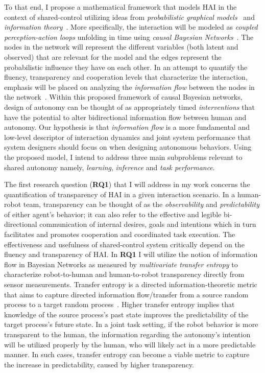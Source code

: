 \documentclass[12pt]{article}
\newcommand{\DGc}[1]{{\textbf{\color{blue}{#1}}}}
\begin{document}
To that end, I propose a mathematical framework that models HAI in the context of shared-control utilizing ideas from \textit{probabilistic graphical models}~\cite{koller2009probabilistic} and \textit{information theory}~\cite{cover2012elements}. More specifically, the interaction will be modeled as \textit{coupled perception-action loops} unfolding in time using \textit{causal Bayesian Networks}~\cite{pearl2009causality}. The nodes in the network will represent the different variables (both latent and observed) that are relevant for the model and the edges represent the probabilistic influence they have on each other. In an attempt to quantify the fluency, transparency and cooperation levels that characterize the interaction, emphasis will be placed on analyzing the \textit{information flow} between the nodes in the network~\cite{ay2008information}. Within this proposed framework of causal Bayesian networks, design of autonomy can be thought of as appropriately timed \textit{interventions} that have the potential to alter bidirectional information flow between human and autonomy.
Our hypothesis is that \textit{information flow} is a more fundamental and low-level descriptor of interaction dynamics and joint system performance that system designers should focus on when designing autonomous behaviors.
Using the proposed model, I intend to address three main subproblems relevant to shared autonomy namely, \textit{learning}, \textit{inference} and \textit{task performance}.

The first research question (\textbf{RQ1}) that I will address in my work concerns the quantification of transparency of HAI in a given interaction scenario. In a human-robot team, transparency can be thought of as the \textit{observability} and \textit{predictability} of either agent's behavior; it can also refer to the effective and legible bi-directional communication of internal desires, goals and intentions which in turn facilitates and promotes cooperation and coordinated task execution. The effectiveness and usefulness of shared-control system critically depend on the fluency and transparency of HAI. In \textbf{RQ1} I will utilize the notion of information flow in Bayesian Networks as measured by \textit{multivariate transfer entropy} to characterize robot-to-human and human-to-robot transparency directly from sensor measurements.  Transfer entropy is a directed information-theoretic metric that aims to capture directed information flow/transfer from a source random process to a target random process~\cite{schreiber2000measuring}. Higher transfer entropy implies that knowledge of the source process's past state improves the predictability of the target process's future state. In a joint task setting, if the robot behavior is more transparent to the human, the information regarding the autonomy's intention will be utilized properly by the human, who will likely act in a more predictable manner. In such cases, transfer entropy can become a viable metric to capture the increase in predictability, caused by higher transparency. 
\end{document}
